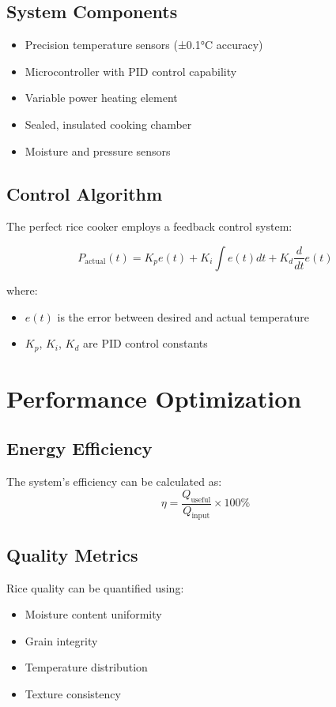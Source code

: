 \documentclass{article}
\begin{document}
\subsection{System Components}
\begin{itemize}
    \item Precision temperature sensors (±0.1°C accuracy)
    \item Microcontroller with PID control capability
    \item Variable power heating element
    \item Sealed, insulated cooking chamber
    \item Moisture and pressure sensors
\end{itemize}

\subsection{Control Algorithm}
The perfect rice cooker employs a feedback control system:

\[
P_{\text{actual}}(t) = K_p e(t) + K_i \int e(t)dt + K_d \frac{d}{dt}e(t)
\]

where:
\begin{itemize}
    \item $e(t)$ is the error between desired and actual temperature
    \item $K_p$, $K_i$, $K_d$ are PID control constants
\end{itemize}

\section{Performance Optimization}
\subsection{Energy Efficiency}
The system's efficiency can be calculated as:
\[
\eta = \frac{Q_{\text{useful}}}{Q_{\text{input}}} \times 100\%
\]

\subsection{Quality Metrics}
Rice quality can be quantified using:
\begin{itemize}
    \item Moisture content uniformity
    \item Grain integrity
    \item Temperature distribution
    \item Texture consistency
\end{itemize}
\end{document}
